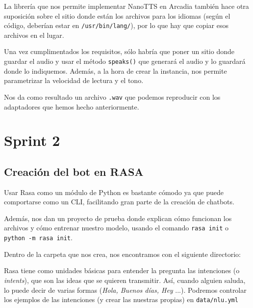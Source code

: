 La librería que nos permite implementar NanoTTS en Arcadia también hace otra suposición sobre el sitio donde están los archivos para los idiomas (según el código, deberían estar en \texttt{/usr/bin/lang/}), por lo que hay que copiar esos archivos en el lugar.

Una vez cumplimentados los requisitos, sólo habría que poner un sitio donde guardar el audio y usar el método \texttt{speaks()} que generará el audio y lo guardará donde lo indiquemos. Además, a la hora de crear la instancia, nos permite parametrizar la velocidad de lectura y el tono.

Nos da como resultado un archivo \texttt{.wav} que podemos reproducir con los adaptadores que hemos hecho anteriormente.


\section{Sprint 2}
\subsection{Creación del bot en RASA}
Usar Rasa \cite{rasa} como un módulo de Python es bastante cómodo ya que puede comportarse como un CLI, facilitando gran parte de la creación de chatbots.

Además, nos dan un proyecto de prueba donde explican cómo funcionan los archivos y cómo entrenar nuestro modelo, usando el comando \texttt{rasa init} o \texttt{python -m rasa init}.

Dentro de la carpeta que nos crea, nos encontramos con el siguiente directorio:



Rasa tiene como unidades básicas para entender la pregunta las intenciones (o \textit{intents}), que son las ideas que se quieren transmitir. Así, cuando alguien saluda, lo puede decir de varias formas (\textit{Hola, Buenos días, Hey} ...). Podremos controlar los ejemplos de las intenciones (y crear las nuestras propias) en \texttt{data/nlu.yml}

